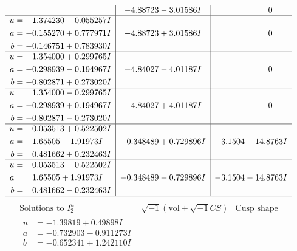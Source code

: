\documentclass[1p]{elsarticle_modified}
\theoremstyle{definition}
\newcommand{\I}{\sqrt{-1}}
\begin{document}
$$\begin{array}{c|c|c}
 & -4.88723 - 3.01586 I & \phantom{-0.000000 } 0 \\ \hline\begin{aligned}
u &= \phantom{-}1.374230 - 0.055257 I \\
a &= -0.155270 + 0.777971 I \\
b &= -0.146751 + 0.783930 I\end{aligned}
 & -4.88723 + 3.01586 I & \phantom{-0.000000 } 0 \\ \hline\begin{aligned}
u &= \phantom{-}1.354000 + 0.299765 I \\
a &= -0.298939 - 0.194967 I \\
b &= -0.802871 + 0.273020 I\end{aligned}
 & -4.84027 - 4.01187 I & \phantom{-0.000000 } 0 \\ \hline\begin{aligned}
u &= \phantom{-}1.354000 - 0.299765 I \\
a &= -0.298939 + 0.194967 I \\
b &= -0.802871 - 0.273020 I\end{aligned}
 & -4.84027 + 4.01187 I & \phantom{-0.000000 } 0 \\ \hline\begin{aligned}
u &= \phantom{-}0.053513 + 0.522502 I \\
a &= \phantom{-}1.65505 - 1.91973 I \\
b &= \phantom{-}0.481662 + 0.232463 I\end{aligned}
 & -0.348489 + 0.729896 I & -3.1504 + 14.8763 I \\ \hline\begin{aligned}
u &= \phantom{-}0.053513 - 0.522502 I \\
a &= \phantom{-}1.65505 + 1.91973 I \\
b &= \phantom{-}0.481662 - 0.232463 I\end{aligned}
 & -0.348489 - 0.729896 I & -3.1504 - 14.8763 I\\
 \hline 
 \end{array}$$\newpage$$\begin{array}{c|c|c}  
\text{Solutions to }I^u_{2}& \I (\text{vol} + \sqrt{-1}CS) & \text{Cusp shape}\\
 \hline 
\begin{aligned}
u &= -1.39819 + 0.49898 I \\
a &= -0.732903 - 0.911273 I \\
b &= -0.652341 + 1.242110 I\end{aligned}

\end{array}$$
\end{document}
